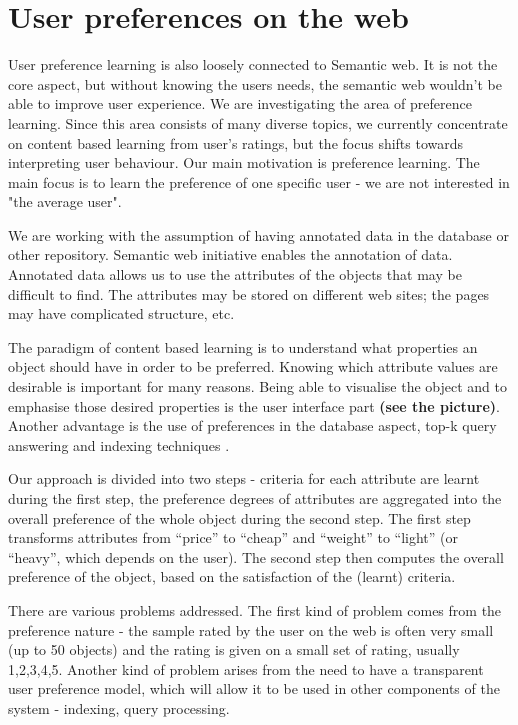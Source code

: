 \documentclass[runningheads,a4paper]{llncs}
\begin{document}
\section{User preferences on the web}
User preference learning is also loosely connected to Semantic web. It is not the core aspect, but without knowing the users needs, the semantic web wouldn't be able to improve user experience. We are investigating the area of preference learning. Since this area consists of many diverse topics, we currently concentrate on content based learning from user's ratings, but the focus shifts towards interpreting user behaviour. Our main motivation is preference learning. The main focus is to learn the preference of one specific user - we are not interested in "the average user".

 
We are working with the assumption of having annotated data in the database or other repository. Semantic web initiative enables the annotation of data. Annotated data allows us to use the attributes of the objects that may be difficult to find. The attributes may be stored on different web sites; the pages may have complicated structure, etc. 


The paradigm of content based learning is to understand what properties an object should have in order to be preferred. Knowing which attribute values are desirable is important for many reasons. Being able to visualise the object and to emphasise those desired properties is the user interface part \cite{biblio:FiserMaster} \textbf{(see the picture)}. Another advantage is the use of preferences in the database aspect, top-k query answering and indexing techniques \cite{Fagin:2001:OAA:375551.375567}. 


Our approach is divided into two steps - criteria for each attribute are learnt during the first step, the preference degrees of attributes are aggregated into the overall preference of the whole object during the second step. The first step transforms attributes from ``price'' to ``cheap'' and ``weight'' to ``light'' (or ``heavy'', which depends on the user). The second step then computes the overall preference of the object, based on the satisfaction of the (learnt) criteria.


There are various problems addressed. The first kind of problem comes from the preference nature - the sample rated by the user on the web is often very small (up to 50 objects) and the rating is given on a small set of rating, usually 1,2,3,4,5. Another kind of problem arises from the need to have a transparent user preference model, which will allow it to be used in other components of the system - indexing, query processing.
\end{document}
